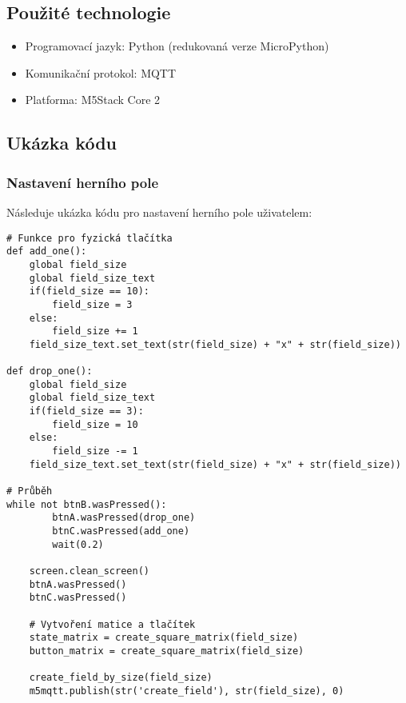 \documentclass[a4paper,12pt]{article}
\begin{document}
\subsection{Použité technologie}
\begin{itemize}
    \item Programovací jazyk: Python (redukovaná verze MicroPython)
    \item Komunikační protokol: MQTT
    \item Platforma: M5Stack Core 2
\end{itemize}

\subsection{Ukázka kódu}
\subsubsection{Nastavení herního pole}
Následuje ukázka kódu pro nastavení herního pole uživatelem:
\begin{lstlisting}
# Funkce pro fyzická tlačítka
def add_one():
    global field_size
    global field_size_text
    if(field_size == 10):
        field_size = 3
    else:
        field_size += 1
    field_size_text.set_text(str(field_size) + "x" + str(field_size))

def drop_one():
    global field_size
    global field_size_text
    if(field_size == 3):
        field_size = 10
    else:
        field_size -= 1
    field_size_text.set_text(str(field_size) + "x" + str(field_size))

# Průběh
while not btnB.wasPressed():
        btnA.wasPressed(drop_one)
        btnC.wasPressed(add_one)
        wait(0.2)
    
    screen.clean_screen()
    btnA.wasPressed()
    btnC.wasPressed()
    
    # Vytvoření matice a tlačítek
    state_matrix = create_square_matrix(field_size)
    button_matrix = create_square_matrix(field_size)
    
    create_field_by_size(field_size)
    m5mqtt.publish(str('create_field'), str(field_size), 0)
\end{lstlisting}
\end{document}
